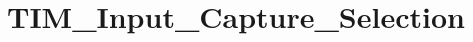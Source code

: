 \hypertarget{group___t_i_m___input___capture___selection}{\section{T\-I\-M\-\_\-\-Input\-\_\-\-Capture\-\_\-\-Selection}
\label{group___t_i_m___input___capture___selection}
}
